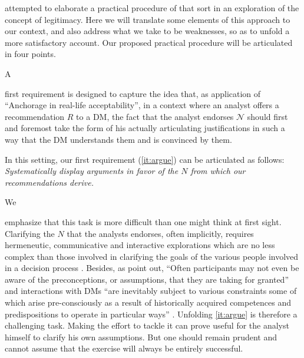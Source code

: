 \documentclass[preprint, french, english, 11pt, authoryear]{elsarticle}%
\newcommand{\adv}{\mathscr{N}}
\begin{document}
\citet{meinard_what_2017} attempted to elaborate a practical procedure of that sort in an exploration of the concept of legitimacy. Here we will translate some elements of this approach to our context, and also address what we take to be weaknesses, so as to unfold a more satisfactory account. 
Our proposed practical procedure will be articulated in four points.

A \begin{changebar}first requirement is designed to capture the idea that, as application of “Anchorage in real-life acceptability”, in a context where an analyst offers a recommendation $R$ to a \ac{DM}, 
the fact that the analyst endorses $\adv$ should first and foremost take the form of his actually articulating justifications in such a way that the \ac{DM} understands them and is convinced by them.
\end{changebar}

In this setting, our first requirement (\cref{it:argue}) can be articulated as follows: \emph{Systematically display arguments in favor of the $N$ from which our recommendations derive.}

We \begin{changebar}emphasize that this task is more difficult than one might think at first sight.
Clarifying the $N$ that the analysts endorses, often implicitly, requires hermeneutic, communicative and interactive explorations which are no less complex than those involved in clarifying the goals of the various people involved in a decision process \citep{reisach_creation_2016}.
Besides, as \citet{cronin_issues_2014} point out, ``Often participants may not even be aware of the preconceptions, or assumptions, that they are taking for granted'' and interactions with \acp{DM} 
``are inevitably subject to various constraints some of which arise pre-consciously as a result of historically acquired competences and predispositions to operate in particular ways'' \citep{brocklesby_ethics_2009}.
Unfolding \cref{it:argue} is therefore a challenging task. Making the effort to tackle it can prove useful for the analyst himself to clarify his own assumptions. But one should remain prudent and cannot assume that the exercise will always be entirely successful.\end{changebar}
\end{document}
